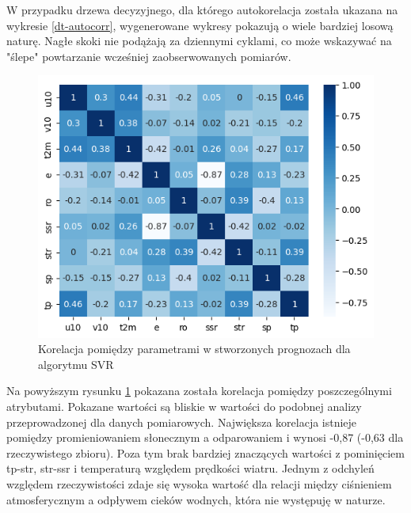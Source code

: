 W przypadku drzewa decyzyjnego, dla którego autokorelacja została ukazana na wykresie \ref{dt-autocorr},
wygenerowane wykresy pokazują o wiele bardziej losową naturę. Nagłe skoki nie podążają za dziennymi cyklami,
co może wskazywać na "ślepe" powtarzanie wcześniej zaobserwowanych pomiarów. 

\begin{figure}[H]
    \centering
    \includegraphics[width=\textwidth]{images/svr_corr_matrix.png}
    \caption{Korelacja pomiędzy parametrami w stworzonych prognozach dla algorytmu SVR}
    \label{svr-corr-matrix}
\end{figure}

Na powyższym rysunku \ref{svr-corr-matrix} pokazana została korelacja pomiędzy poszczególnymi atrybutami.
Pokazane wartości są bliskie w wartości do podobnej analizy przeprowadzonej dla danych pomiarowych. 
Największa korelacja istnieje pomiędzy promieniowaniem słonecznym a odparowaniem i wynosi -0,87 (-0,63 dla
rzeczywistego zbioru). Poza tym brak bardziej znaczących wartości z pominięciem tp-str, str-ssr i temperaturą
względem prędkości wiatru. Jednym z odchyleń względem rzeczywistości zdaje się wysoka wartość dla 
relacji między ciśnieniem atmosferycznym a odpływem cieków wodnych, która nie występuję w naturze.

